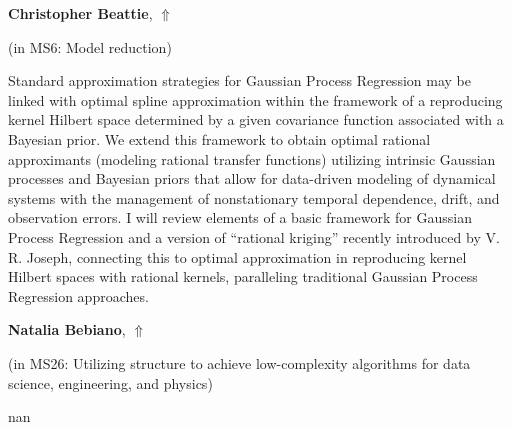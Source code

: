 \documentclass[ILAS2025-program.tex]{subfiles}
\begin{document}
     \hypertarget{down0211}{}\begin{ilasabstract}
    
    \textbf{Christopher Beattie},  \hfill \hyperlink{up0211}{$\Uparrow$}
    
    (in {\color{mstitle}MS6: Model reduction})
        
        \mtskip
    Standard approximation strategies for Gaussian Process Regression may be linked with optimal spline approximation within the framework of a reproducing kernel Hilbert space determined by a given covariance function associated with a Bayesian prior.   We extend this framework to obtain optimal rational approximants (modeling rational transfer functions) utilizing intrinsic Gaussian processes and Bayesian priors that allow for data-driven modeling of dynamical systems with the management of nonstationary temporal dependence, drift, and observation errors.  I will review elements of a basic framework for Gaussian Process Regression and a version of ``rational kriging'' recently introduced by V. R. Joseph,  connecting this to optimal approximation in reproducing kernel Hilbert spaces with rational kernels, paralleling traditional Gaussian Process Regression approaches.
\end{ilasabstract}
     \hypertarget{down0060}{}\begin{ilasabstract}
    
    \textbf{Natalia Bebiano},  \hfill \hyperlink{up0060}{$\Uparrow$}
    
    (in {\color{mstitle}MS26: Utilizing structure to achieve low-complexity algorithms for data science, engineering, and physics})
        
        \mtskip
    nan\end{ilasabstract}
\end{document}
